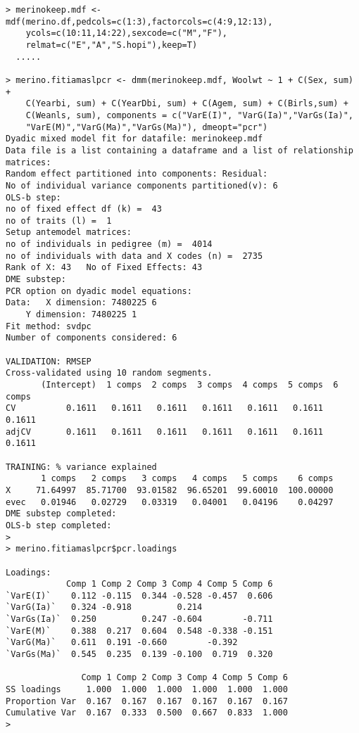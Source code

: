 \documentclass[titlepage]{article}  %
\begin{document}
\begin{verbatim}
> merinokeep.mdf <- mdf(merino.df,pedcols=c(1:3),factorcols=c(4:9,12:13),
    ycols=c(10:11,14:22),sexcode=c("M","F"),
    relmat=c("E","A","S.hopi"),keep=T)
  .....

> merino.fitiamaslpcr <- dmm(merinokeep.mdf, Woolwt ~ 1 + C(Sex, sum) +
    C(Yearbi, sum) + C(YearDbi, sum) + C(Agem, sum) + C(Birls,sum) +
    C(Weanls, sum), components = c("VarE(I)", "VarG(Ia)","VarGs(Ia)",
    "VarE(M)","VarG(Ma)","VarGs(Ma)"), dmeopt="pcr")
Dyadic mixed model fit for datafile: merinokeep.mdf  
Data file is a list containing a dataframe and a list of relationship matrices:
Random effect partitioned into components: Residual:
No of individual variance components partitioned(v): 6 
OLS-b step:
no of fixed effect df (k) =  43 
no of traits (l) =  1 
Setup antemodel matrices:
no of individuals in pedigree (m) =  4014 
no of individuals with data and X codes (n) =  2735 
Rank of X: 43   No of Fixed Effects: 43 
DME substep:
PCR option on dyadic model equations:
Data: 	X dimension: 7480225 6 
	Y dimension: 7480225 1
Fit method: svdpc
Number of components considered: 6

VALIDATION: RMSEP
Cross-validated using 10 random segments.
       (Intercept)  1 comps  2 comps  3 comps  4 comps  5 comps  6 comps
CV          0.1611   0.1611   0.1611   0.1611   0.1611   0.1611   0.1611
adjCV       0.1611   0.1611   0.1611   0.1611   0.1611   0.1611   0.1611

TRAINING: % variance explained
       1 comps   2 comps   3 comps   4 comps   5 comps    6 comps
X     71.64997  85.71700  93.01582  96.65201  99.60010  100.00000
evec   0.01946   0.02729   0.03319   0.04001   0.04196    0.04297
DME substep completed:
OLS-b step completed:
>
> merino.fitiamaslpcr$pcr.loadings

Loadings:
            Comp 1 Comp 2 Comp 3 Comp 4 Comp 5 Comp 6
`VarE(I)`    0.112 -0.115  0.344 -0.528 -0.457  0.606
`VarG(Ia)`   0.324 -0.918         0.214              
`VarGs(Ia)`  0.250         0.247 -0.604        -0.711
`VarE(M)`    0.388  0.217  0.604  0.548 -0.338 -0.151
`VarG(Ma)`   0.611  0.191 -0.660        -0.392       
`VarGs(Ma)`  0.545  0.235  0.139 -0.100  0.719  0.320

               Comp 1 Comp 2 Comp 3 Comp 4 Comp 5 Comp 6
SS loadings     1.000  1.000  1.000  1.000  1.000  1.000
Proportion Var  0.167  0.167  0.167  0.167  0.167  0.167
Cumulative Var  0.167  0.333  0.500  0.667  0.833  1.000
> 
\end{verbatim}
\end{document}
